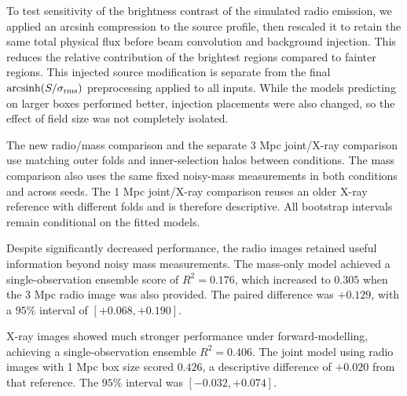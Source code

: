 To test sensitivity of the brightness contrast of the simulated radio emission, we applied an arcsinh compression to the source profile, then rescaled it to retain the same total physical flux before beam convolution and background injection.
This reduces the relative contribution of the brightest regions compared to fainter regions.
This injected source modification is separate from the final $\operatorname{arcsinh}(S/\sigma_{\rm rms})$ preprocessing applied to all inputs.
While the models predicting on larger boxes performed better, injection placements were also changed, so the effect of field size was not completely isolated.

The new radio/mass comparison and the separate 3 Mpc joint/X-ray comparison use matching outer folds and inner-selection halos between conditions.
The mass comparison also uses the same fixed noisy-mass measurements in both conditions and across seeds.
The 1 Mpc joint/X-ray comparison reuses an older X-ray reference with different folds and is therefore descriptive.
All bootstrap intervals remain conditional on the fitted models.

Despite significantly decreased performance, the radio images retained useful information beyond noisy mass measurements.
The mass-only model achieved a single-observation ensemble score of $R^2 = 0.176$, which increased to $0.305$ when the 3 Mpc radio image was also provided.
The paired difference was $+0.129$, with a $95\%$ interval of $[+0.068, +0.190]$.

X-ray images showed much stronger performance under forward-modelling, achieving a single-observation ensemble $R^2 = 0.406$.
The joint model using radio images with 1 Mpc box size scored $0.426$, a descriptive difference of $+0.020$ from that reference.
The $95\%$ interval was $[-0.032, +0.074]$.

